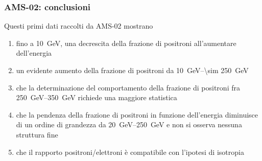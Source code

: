 \documentclass[10pt]{beamer}
\begin{document}
\begin{frame}
  \frametitle{AMS-02: conclusioni}
  Questi primi dati raccolti da AMS-02 mostrano
  \begin{enumerate}[<+->]
  \item fino a \SI{10}{\giga \electronvolt}, una
    \alert{decrescita della frazione di positroni} all'aumentare dell'energia
  \item un evidente \alert{aumento della frazione di positroni} da
    \SIrange[range-phrase={ fino a }]{10}{\sim 250}{\giga \electronvolt}
  \item che la determinazione del comportamento della frazione di positroni fra
    \SIrange[range-phrase={ e }]{250}{350}{\giga \electronvolt} richiede una
    \alert{maggiore statistica}
  \item che la
    \alert{pendenza della frazione di positroni in funzione dell'energia
      diminuisce}
    di un ordine di grandezza da
    \SIrange[range-phrase={ a }]{20}{250}{\giga \electronvolt} e non si osserva
    \alert{nessuna struttura fine}
  \item che il rapporto positroni/elettroni è compatibile con l'ipotesi di
    isotropia
  \end{enumerate}
\end{frame}
\end{document}
